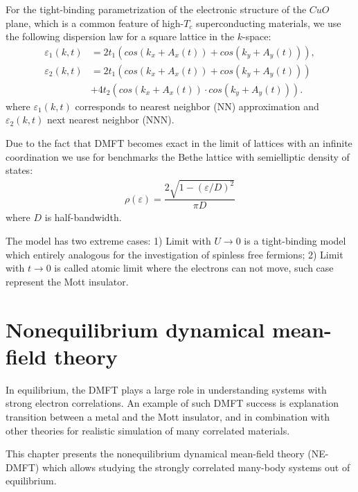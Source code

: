 For the tight-binding parametrization of the electronic structure of the $CuO$ plane, which is a common feature of high-$T_c$ superconducting materials, we use the following dispersion law for a square lattice in the $k$-space:
\begin{subequations}
\begin{align}
\label{dispersion_1}
\varepsilon_1(k,t)
&=
{2t_1(cos(k_x+ A_x(t))+cos(k_y+A_y(t)))},
\\
\label{dispersion_2}
\varepsilon_2(k,t)
&=
	2t_1(cos(k_x+A_x(t))+cos(k_y+A_y(t)))
		\nonumber
		\\
 &+
4t_2(cos(k_x+A_x(t))\cdot cos(k_y+A_y(t))).
\end{align}
\end{subequations}
where $\varepsilon_1(k,t)$ corresponds to nearest neighbor (NN) approximation and $\varepsilon_2(k,t)$ next nearest neighbor (NNN).

Due to the fact that DMFT becomes exact in the limit of lattices with an infinite coordination we use for benchmarks the Bethe lattice with semielliptic density of states:
\begin{align}
\label{Bethe_lattice}
\rho(\varepsilon)=\dfrac{2\sqrt{1-(\varepsilon/D)^2}}{\pi D}
\end{align}
where $D$ is half-bandwidth.

The model has two extreme cases: 1) Limit with $U\rightarrow 0$ is a tight-binding model which entirely analogous for the investigation of spinless free fermions; 2) Limit with $t\rightarrow 0$ is called atomic limit where the electrons can not move, such case represent the Mott insulator.

\FloatBarrier

\section{ Nonequilibrium dynamical mean-field theory}
\label{section:NE_DMFT}
In equilibrium, the DMFT \citep{RevModPhys.68.13} plays a large role in understanding systems with strong electron correlations. An example of such DMFT success is explanation transition between a metal and the Mott insulator, and in combination with other theories for realistic simulation of many correlated materials. 

This chapter presents the nonequilibrium dynamical mean-field theory (NE-DMFT) \citep{RevModPhys.86.779} which allows studying the strongly correlated many-body systems out of equilibrium. 


\FloatBarrier
